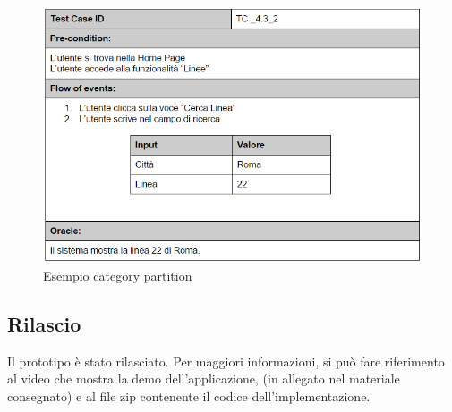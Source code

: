\begin{figure}[h]
\centering
\includegraphics[scale=.6]{img/23.png}
\caption{Esempio category partition }
\label{fig:mhs}
\end{figure} 

\subsection{Rilascio}
Il prototipo è stato rilasciato. Per maggiori informazioni, si pu\`{o} fare riferimento al video che mostra la demo dell\rq applicazione, (in allegato nel materiale consegnato) e al file zip contenente il codice dell\rq implementazione.
